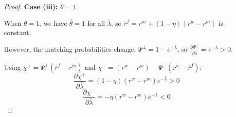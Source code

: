 \begin{proof}
\textbf{Case (iii): $\theta = 1$}

When $\theta = 1$, we have $\bar{\theta} = 1$ for all $\bar{\lambda}$, so $\overline{r}^{f} = r^{m} + (1-\eta)(r^{w}-r^{m})$ is constant.

However, the matching probabilities change: $\Psi^{\pm} = 1 - e^{-\bar{\lambda}}$, so $\frac{\partial\Psi^{\pm}}{\partial\bar{\lambda}} = e^{-\bar{\lambda}} > 0$.

Using $\chi^{+} = \Psi^{+}(\overline{r}^{f} - r^{m})$ and $\chi^{-} = (r^{w} - r^{m}) - \Psi^{-}(r^{w} - \overline{r}^{f})$:
\[
\frac{\partial\chi^{+}}{\partial\bar{\lambda}} = (1-\eta)(r^{w}-r^{m})e^{-\bar{\lambda}} > 0
\]
\[
\frac{\partial\chi^{-}}{\partial\bar{\lambda}} = -\eta(r^{w}-r^{m})e^{-\bar{\lambda}} < 0
\]
\end{proof}